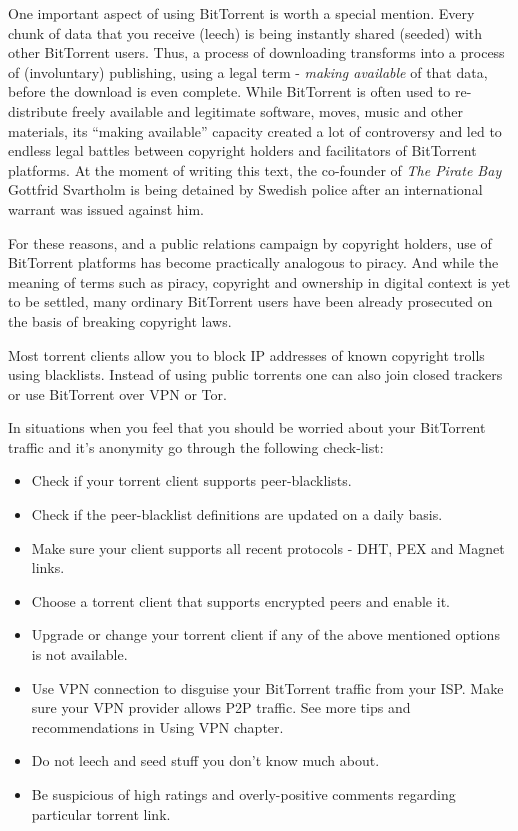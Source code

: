 One important aspect of using BitTorrent is worth a special mention.
Every chunk of data that you receive (leech) is being instantly shared
(seeded) with other BitTorrent users. Thus, a process of downloading
transforms into a process of (involuntary) publishing, using a legal
term - \emph{making available} of that data, before the download is even
complete. While BitTorrent is often used to re-distribute freely
available and legitimate software, moves, music and other materials, its
``making available'' capacity created a lot of controversy and led to
endless legal battles between copyright holders and facilitators of
BitTorrent platforms. At the moment of writing this text, the co-founder
of \emph{The Pirate Bay} Gottfrid Svartholm is being detained by Swedish
police after an international warrant was issued against him.

For these reasons, and a public relations campaign by copyright holders,
use of BitTorrent platforms has become practically analogous to piracy.
And while the meaning of terms such as piracy, copyright and ownership
in digital context is yet to be settled, many ordinary BitTorrent users
have been already prosecuted on the basis of breaking copyright laws.

Most torrent clients allow you to block IP addresses of known copyright
trolls using blacklists. Instead of using public torrents one can also
join closed trackers or use BitTorrent over VPN or Tor.

In situations when you feel that you should be worried about your
BitTorrent traffic and it's anonymity go through the following
check-list:

\begin{itemize}
\item
  Check if your torrent client supports peer-blacklists.
\item
  Check if the peer-blacklist definitions are updated on a daily basis.
\item
  Make sure your client supports all recent protocols - DHT, PEX and
  Magnet links.
\item
  Choose a torrent client that supports encrypted peers and enable it.
\item
  Upgrade or change your torrent client if any of the above mentioned
  options is not available.
\item
  Use VPN connection to disguise your BitTorrent traffic from your ISP.
  Make sure your VPN provider allows P2P traffic. See more tips and
  recommendations in Using VPN chapter.
\item
  Do not leech and seed stuff you don't know much about.
\item
  Be suspicious of high ratings and overly-positive comments regarding
  particular torrent link.
\end{itemize}
